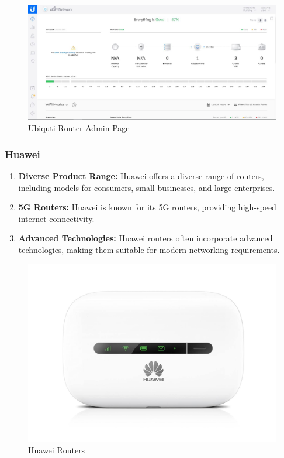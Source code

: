 \documentclass[11pt]{article}
\begin{document}
\begin{figure}[H]
  \centering
  \includegraphics[width=.95\textwidth]{ubiquiti router admin page/ubiquiti router admin page_2.jpg}
  \caption{Ubiquti Router Admin Page}
\end{figure}

\subsubsection{Huawei}
\begin{enumerate}
  \item \textbf{Diverse Product Range:} Huawei offers a diverse range of routers, including models for consumers, small businesses, and large enterprises.

  \item \textbf{5G Routers:} Huawei is known for its 5G routers, providing high-speed internet connectivity.

  \item \textbf{Advanced Technologies:} Huawei routers often incorporate advanced technologies, making them suitable for modern networking requirements.
\end{enumerate}

\begin{figure}[H]
  \centering
  \includegraphics[width=.45\textwidth]{huawei routers/huawei routers_8.jpg}
  \caption{Huawei Routers}
\end{figure}
\end{document}
